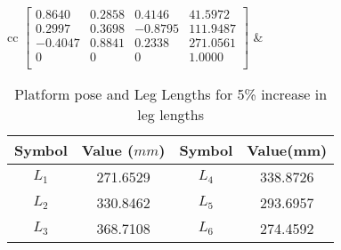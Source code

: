\documentclass[10pt]{article}
\begin{document}
\begin{table*}[h!]
	\centering
	\begin{tabular}{cc}
		$\begin{bmatrix}
		0.8640  & 0.2858 & 0.4146  & 41.5972  \\ 
		0.2997  & 0.3698 & -0.8795 & 111.9487 \\ 
		-0.4047 & 0.8841 & 0.2338  & 271.0561 \\ 
		0       & 0      & 0       & 1.0000   \\ 
		\end{bmatrix}$
		& 
		\begin{tabular}{cccc}
			\hline
			Symbol & Value ($mm$) & Symbol & Value(mm) \\
			\hline
			$L_1$ & 271.6529 & $L_4$ & 338.8726\\
			$L_2$ & 330.8462 & $L_5$ & 293.6957\\
			$L_3$ & 368.7108 & $L_6$ & 274.4592\\	 	\hline
		\end{tabular}
	\end{tabular}
	\caption{Platform pose and Leg Lengths for 5\% increase in leg lengths}
\end{table*}

\pagebreak

\pagebreak

\pagebreak

\pagebreak

\end{document}
